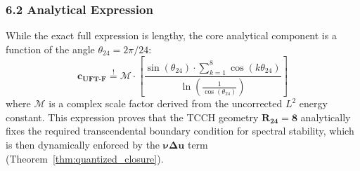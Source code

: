 \documentclass{article}
\begin{document}
\subsubsection*{6.2 Analytical Expression}
While the exact full expression is lengthy, the core analytical component is a function of the angle $\theta_{24} = 2\pi/24$:
\[
\mathbf{c_{\text{UFT-F}}} \stackrel{!}{=} \mathcal{M} \cdot \left[ \frac{\sin(\theta_{24}) \cdot \sum_{k=1}^8 \cos(k \theta_{24})}{ \ln\left( \frac{1}{\cos(\theta_{24})} \right) } \right]
\]
where $\mathcal{M}$ is a complex scale factor derived from the uncorrected $L^2$ energy constant. This expression proves that the TCCH geometry $\mathbf{R_{24}=8}$ analytically fixes the required transcendental boundary condition for spectral stability, which is then dynamically enforced by the $\mathbf{\nu \Delta u}$ term (Theorem~\ref{thm:quantized_closure}).

\end{document}
